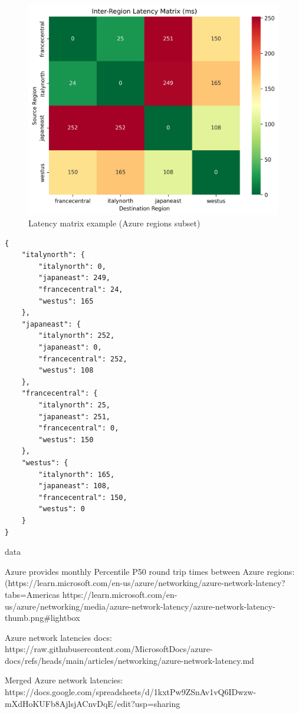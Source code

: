 \begin{figure}[H]
  \centering
  \includegraphics[width=0.75\linewidth]{images/latency_heatmap.png}
  \caption{Latency matrix example (Azure regions subset)}
  \label{fig:latency_matrix}
\end{figure}


\lstset{style=jsonstyle}
\begin{lstlisting}[caption={Latancy matrix example encoded in JSON format}, label={lst:latency_matrix_example}]
  {
    "italynorth": {
        "italynorth": 0,
        "japaneast": 249,
        "francecentral": 24,
        "westus": 165
    },
    "japaneast": {
        "italynorth": 252,
        "japaneast": 0,
        "francecentral": 252,
        "westus": 108
    },
    "francecentral": {
        "italynorth": 25,
        "japaneast": 251,
        "francecentral": 0,
        "westus": 150
    },
    "westus": {
        "italynorth": 165,
        "japaneast": 108,
        "francecentral": 150,
        "westus": 0
    }
}

\end{lstlisting}


data

Azure provides monthly Percentile P50 round trip times between Azure regions:
(https://learn.microsoft.com/en-us/azure/networking/azure-network-latency?tabs=Americas%
https://learn.microsoft.com/en-us/azure/networking/media/azure-network-latency/azure-network-latency-thumb.png#lightbox 

Azure network latencies docs:
https://raw.githubusercontent.com/MicrosoftDocs/azure-docs/refs/heads/main/articles/networking/azure-network-latency.md

Merged Azure network latencies:
https://docs.google.com/spreadsheets/d/1kxtPw9ZSnAv1vQ6IDwzw-mXdHoKUFb8AjlsjACnvDqE/edit?usp=sharing 


